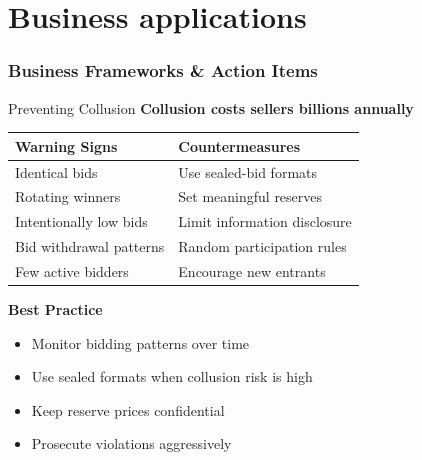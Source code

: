\documentclass[xcolor={x11names}]{beamer}
\begin{document}
\part{Business applications}


\section{Business Frameworks \& Action Items}


\begin{frame}{Preventing Collusion}
\textbf{Collusion costs sellers billions annually}

\begin{center}
\begin{tabular}{p{4.5cm}p{4.5cm}}
\toprule
\textbf{Warning Signs} & \textbf{Countermeasures} \\
\midrule
\rowcolor{red!10}
Identical bids & Use sealed-bid formats \\
\rowcolor{red!10}
Rotating winners & Set meaningful reserves \\
\rowcolor{red!10}
Intentionally low bids & Limit information disclosure \\
\rowcolor{red!10}
Bid withdrawal patterns & Random participation rules \\
\rowcolor{red!10}
Few active bidders & Encourage new entrants \\
\bottomrule
\end{tabular}
\end{center}

\textbf{Best Practice}
\begin{itemize}
  \item Monitor bidding patterns over time
  \item Use sealed formats when collusion risk is high
  \item Keep reserve prices confidential
  \item Prosecute violations aggressively
\end{itemize}
\end{frame}
\end{document}
